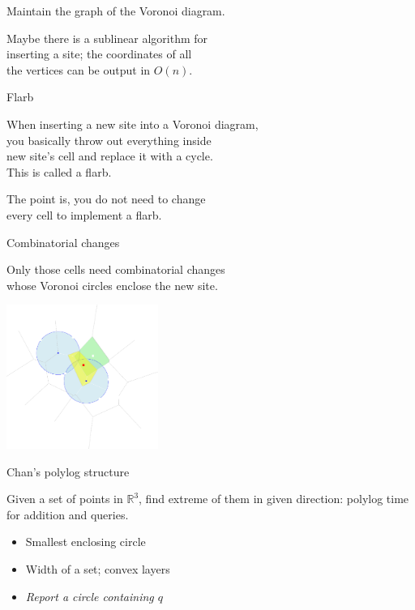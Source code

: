 \documentclass[17pt]{extarticle}
\newcommand{\newslide}[1]{\newpage \begin{center} \large #1 \end{center}}
\begin{document}
Maintain the graph of the Voronoi diagram.

Maybe there is a sublinear algorithm for \\
inserting a site; the coordinates of all \\
the vertices can be output in \(O(n)\).

\newslide{Flarb} \vspace{-6mm}

When inserting a new site into a Voronoi diagram, \\
you basically throw out everything inside \\
new site's cell and replace it with a cycle. \\
This is called a flarb.

The point is, you do not need to change \\
every cell to implement a flarb.

\newslide{Combinatorial changes} \vspace{-7mm}

Only those cells need combinatorial changes \\
whose Voronoi circles enclose the new site.

\begin{center}
	\includegraphics[height=4.7cm]{figs/identChanges-dark}
\end{center}

\newslide{Chan's polylog structure} \vspace{-5mm}

Given a set of points in \( \mathbb R^3 \), find extreme of them in given direction: polylog time for addition and queries.

\begin{itemize}
	\item Smallest enclosing circle
	\item Width of a set; convex layers
	\item {\it Report a circle containing \(q\)}
\end{itemize}
\end{document}

